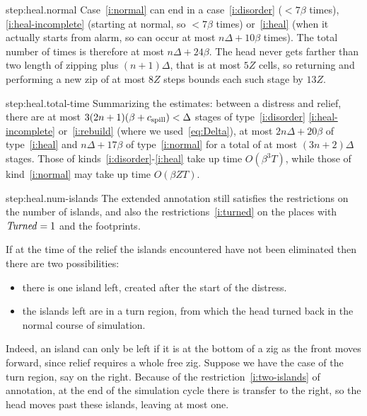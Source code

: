 \documentclass[11pt]{memoir}
\theoremstyle{definition} %
\newcommand{\fld}[1]{\ensuremath{\textit{#1\/}}}
\newcommand{\Tu}{T}
\newcommand{\Z}{Z} %
\newcommand{\Turned}{\fld{Turned}} %
\newcommand{\cns}[1]{c_{\textrm{\upshape #1}}}
\newcommand{\CSpill}{\cns{spill}}
\begin{document}
\begin{Proof}
\begin{step+}{step:heal.normal}
Case~\eqref{i:normal} can end in a case~\eqref{i:disorder} (\( < 7\beta \) times),
\eqref{i:heal-incomplete} (starting at normal, so \( <7\beta \) times) or~\eqref{i:heal} 
(when it actually starts from alarm, so can occur at most \( n\Delta+10\beta \) times).
The total number of times is therefore at most \( n\Delta+24\beta \).
The head never gets farther than two length of zipping plus \( (n+1)\Delta \), that is at most
\( 5\Z \) cells, so returning and performing a new zip of at most \( 8\Z \) steps bounds
each such stage by \( 13\Z \).
\end{step+}

\begin{step+}{step:heal.total-time}
  Summarizing the estimates: between a distress and relief,
  there are at most \( 3(2n+1)(\beta+\CSpill) < \Delta \) stages of type~\eqref{i:disorder}
  \eqref{i:heal-incomplete} or~\eqref{i:rebuild} (where we used~\eqref{eq:Delta}),
  at most \( 2 n\Delta+20\beta \) of type~\eqref{i:heal}
  and \(  n\Delta+17\beta \) of type~\eqref{i:normal} for a total of 
 at most \( (3n+2)\Delta \) stages.
  Those of kinds~\eqref{i:disorder}-\eqref{i:heal} take up time
  \( O(\beta^{3}\Tu) \), while those of kind~\eqref{i:normal} may take up time \( O(\beta\Z\Tu) \).
\end{step+}

\begin{step+}{step:heal.num-islands}
  The extended annotation still satisfies the restrictions on the number of islands, and also
  the restrictions~\eqref{i:turned} on the places with \( \Turned=1 \) and the footprints.
  
\end{step+}
\begin{pproof}
If at the time of the relief the islands encountered have not been eliminated
  then there are two possibilities:
  \begin{itemize}
  \item there is one island left, created after the start of the distress.
  \item the islands left are in a turn region, from which the head turned back
    in the normal course of simulation.
  \end{itemize}
  Indeed, an island can only be left if it is at the bottom of a zig as the front moves
  forward, since relief requires a whole free zig.
Suppose we have the case of the turn region, say on the right.
Because of the restriction~\eqref{i:two-islands} of annotation, at the end of the simulation cycle there
is transfer to the right, so the head moves past these islands, leaving at most one.


\end{pproof}
\end{Proof}
\end{document}
